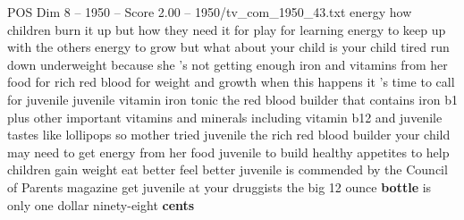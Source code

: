 \begin{textsample}{POS Dim 8 – 1950 – Score 2.00 – 1950/tv\_com\_1950\_43.txt}  \label{ex:f8_pos_014}
energy how children burn it up but how they need it for play for learning energy to keep up with the others energy to grow but what about your child is your child tired run down underweight because she 's not getting enough iron and vitamins from her food for rich red blood for weight and growth when this happens it 's time to call for juvenile juvenile vitamin iron tonic the red blood builder that contains iron b1 plus other important vitamins and minerals including vitamin b12 and juvenile tastes like lollipops so mother tried juvenile the rich red blood builder your child may need to get energy from her food juvenile to build healthy appetites to help children gain weight eat better feel better juvenile is commended by the Council of Parents magazine get juvenile at your druggists the big 12 ounce \textbf{bottle} is only one dollar ninety-eight \textbf{cents}

\end{textsample}
